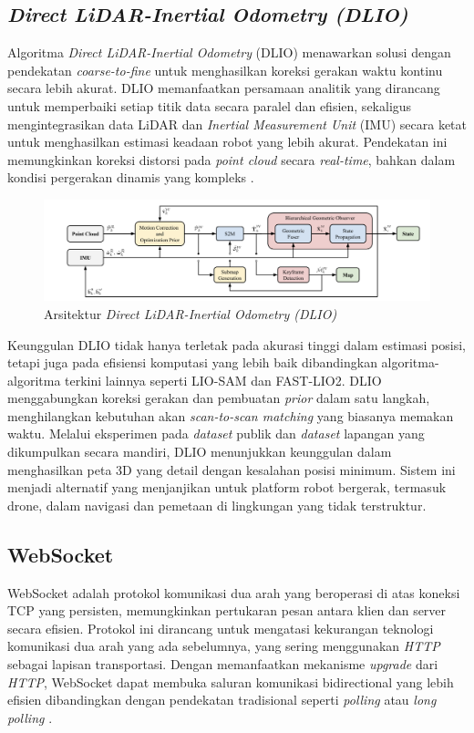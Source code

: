 \subsection{\emph{Direct LiDAR-Inertial Odometry (DLIO)}}
Algoritma \emph{Direct LiDAR-Inertial Odometry} (DLIO) menawarkan solusi dengan pendekatan \emph{coarse-to-fine} untuk menghasilkan koreksi gerakan waktu kontinu secara lebih akurat. DLIO memanfaatkan persamaan analitik yang dirancang untuk memperbaiki setiap titik data secara paralel dan efisien, sekaligus mengintegrasikan data LiDAR dan \emph{Inertial Measurement Unit} (IMU) secara ketat untuk menghasilkan estimasi keadaan robot yang lebih akurat. Pendekatan ini memungkinkan koreksi distorsi pada \emph{point cloud} secara \emph{real-time}, bahkan dalam kondisi pergerakan dinamis yang kompleks \cite{chen2022dlio}.


\begin{figure} [H] \centering
  \includegraphics[scale=0.6]{gambar/dlio_Arch.png}
  \caption{Arsitektur \emph{Direct LiDAR-Inertial Odometry (DLIO)}}
  \label{fig:DLIO Architecture}
\end{figure}

Keunggulan DLIO tidak hanya terletak pada akurasi tinggi dalam estimasi posisi, tetapi juga pada efisiensi komputasi yang lebih baik dibandingkan algoritma-algoritma terkini lainnya seperti LIO-SAM dan FAST-LIO2. DLIO menggabungkan koreksi gerakan dan pembuatan \emph{prior} dalam satu langkah, menghilangkan kebutuhan akan \emph{scan-to-scan matching} yang biasanya memakan waktu. Melalui eksperimen pada \emph{dataset} publik dan \emph{dataset} lapangan yang dikumpulkan secara mandiri, DLIO menunjukkan keunggulan dalam menghasilkan peta 3D yang detail dengan kesalahan posisi minimum. Sistem ini menjadi alternatif yang menjanjikan untuk platform robot bergerak, termasuk drone, dalam navigasi dan pemetaan di lingkungan yang tidak terstruktur.

\subsection{WebSocket}
WebSocket adalah protokol komunikasi dua arah yang beroperasi di atas koneksi TCP yang persisten, memungkinkan pertukaran pesan antara klien dan server secara efisien. Protokol ini dirancang untuk mengatasi kekurangan teknologi komunikasi dua arah yang ada sebelumnya, yang sering menggunakan \emph{HTTP} sebagai lapisan transportasi. Dengan memanfaatkan mekanisme \emph{upgrade} dari \emph{HTTP}, WebSocket dapat membuka saluran komunikasi bidirectional yang lebih efisien dibandingkan dengan pendekatan tradisional seperti \emph{polling} atau \emph{long polling} \cite{Fette2011}.


